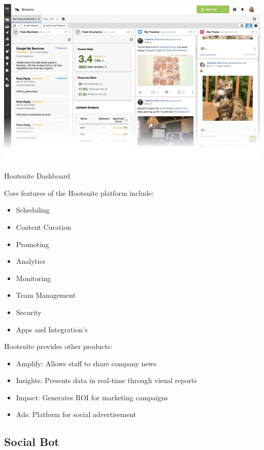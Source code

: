 \documentclass[chapterprefix=false]{scrreprt}
\begin{document}
\begin{center}
 \includegraphics[scale=0.5]{hootsuite-dashboard}
 \newline
 \caption{Hootsuite Dashboard \cite{gesenhues_gesenhues_2019}}
\end{center}

Core features of the Hootsuite platform include:

\begin{itemize}
 \setlength\itemsep{-0.75em}
 \item Scheduling
 \item Content Curation
 \item Promoting
 \item Analytics
 \item Monitoring
 \item Team Management
 \item Security
 \item Apps and Integration's
\end{itemize}

Hootsuite provides other products:

\begin{itemize}
 \setlength\itemsep{-0.75em}
 \item Amplify: Allows staff to share company news
 \item Insights: Presents data in real-time through visual reports
 \item Impact: Generates ROI for marketing campaigns
 \item Ads: Platform for social advertisement
\end{itemize}

\subsection{Social Bot}
\end{document}
